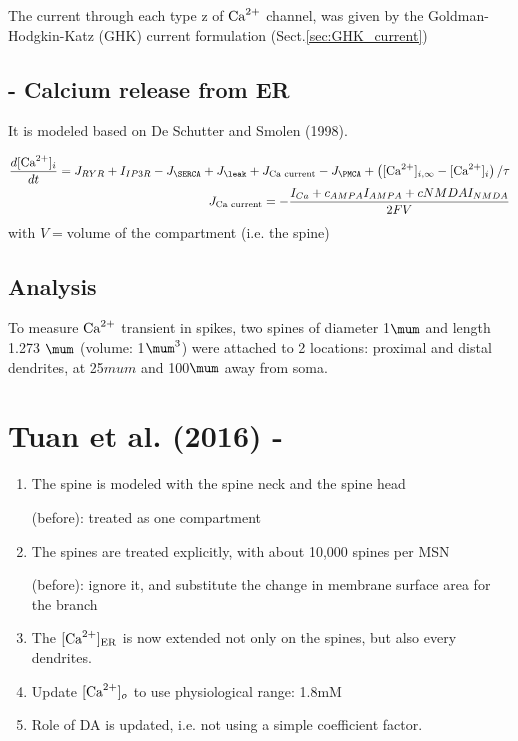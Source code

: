 The current through each type z of ${\text{Ca}^{2+}}$ channel, was given
by the Goldman-Hodgkin-Katz (GHK) current formulation (Sect.\ref{sec:GHK_current})

\subsection{- Calcium release from ER}

It is modeled based on De Schutter and Smolen (1998).

\begin{equation}
\begin{split}
\frac{d[\Ca]_i}{dt } = J_{RYR} + I_{IP3R} - J_\SERCA
           + J_\leak + J_\text{Ca current} - J_\PMCA
           + \left( [\Ca]_{i,\infty} - [\Ca]_i \right) / \tau \\
J_\text{Ca current} = - \frac{I_{Ca} + c_{AMPA} I_{AMPA} + c{NMDA} I_{NMDA}}{2F
V}
\end{split}           
\end{equation}
with $V = $volume of the compartment (i.e. the spine)


\subsection{Analysis}

To measure ${\text{Ca}^{2+}}$ transient in spikes, two spines of diameter 1$\mum$ and length
1.273 $\mum$ (volume: 1$\mum^3$) were attached to 2 locations: proximal and
distal dendrites, at 25$mum$ and 100$\mum$ away from soma.

\section{Tuan et al. (2016) - }

\begin{enumerate}
  \item The spine is modeled with the spine neck and the spine head 
  
  (before): treated as one compartment
  
  \item The spines are treated explicitly, with about 10,000 spines per MSN

  (before): ignore it, and substitute the change in membrane surface area
  for the branch
  
  \item  The $[{\text{Ca}^{2+}}]_{\text{ER}}$ is now extended not only on the spines, but also every
dendrites.
  
  \item Update $[{\text{Ca}^{2+}}]_o$ to use physiological range: 1.8mM
  
  \item Role of DA is updated, i.e. not using a simple coefficient factor.
\end{enumerate}

